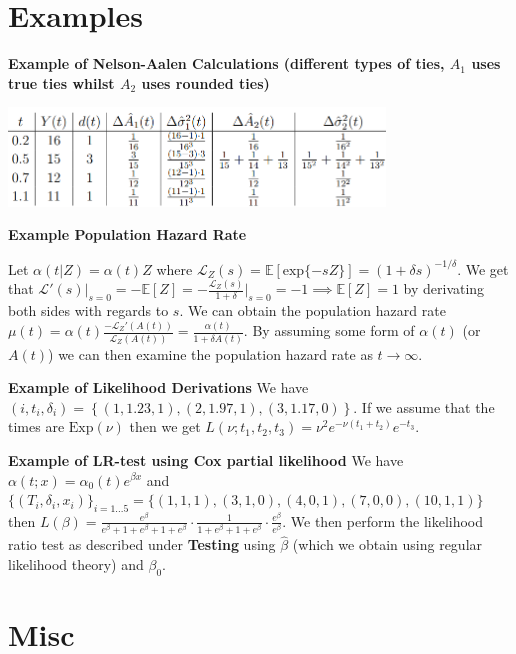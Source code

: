 \documentclass{article}
\begin{document}
\newpage

\section*{Examples}

\textbf{Example of Nelson-Aalen Calculations (different types of ties, $A_1$ uses true ties whilst $A_2$ uses rounded ties)} 

\includegraphics[width=10cm]{surv_table.png}

\medskip

\textbf{Example Population Hazard Rate}

Let $\alpha(t|Z) = \alpha(t)Z$ where $\mathcal{L}_Z(s) = \mathbb{E}[\text{exp}\{-sZ\}] = (1+\delta s)^{-1/\delta}$. We get that $\mathcal{L}'(s)\big|_{s=0}  = -\mathbb{E}[Z] = -\frac{\mathcal{L}_Z(s)}{1+\delta }\big|_{s=0} = -1 \implies \mathbb{E}[Z] = 1$ by derivating both sides with regards to $s$. We can obtain the population hazard rate $\mu(t) = \alpha(t)\frac{-\mathcal{L}_Z'(A(t))}{\mathcal{L}_Z(A(t))} = \frac{\alpha(t)}{1 + \delta A(t)}$. By assuming some form of $\alpha(t)$ (or $A(t)$) we can then examine the population hazard rate as $t \to \infty$. 

\medskip

\textbf{Example of Likelihood Derivations} We have $(i, t_i, \delta_i) = \left\{(1,1.23,1),(2,1.97,1),(3, 1.17, 0)\right\}$. If we assume that the times are $\text{Exp}(\nu)$ then we get $L(\nu; t_1, t_2, t_3) = \nu^2 e^{-\nu(t_1 + t_2)} e^{-t_3}$. 

\medskip

\textbf{Example of LR-test using Cox partial likelihood}
We have $\alpha(t; x) = \alpha_0(t)e^{\beta x}$ and 
$\{(T_i, \delta_i, x_i)\}_{i=1...5} = \{(1, 1, 1),(3, 1, 0),(4, 0, 1),(7, 0, 0),(10, 1, 1) \}$ then $L(\beta) = \frac{e^{\beta}}{e^{\beta}+1+e^{\beta}+1+e^{\beta}} \cdot \frac{1}{1+e^{\beta}+1+e^{\beta}} \cdot \frac{e^{\beta}}{e^{\beta}}$. We then perform the likelihood ratio test as described under \textbf{Testing} using $\hat\beta$ (which we obtain using regular likelihood theory) and $\beta_0$. 

\section*{Misc}
\end{document}
